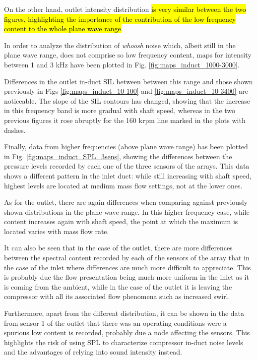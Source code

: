 On the other hand, outlet intensity distribution \hl{is very similar between the two figures, highlighting the importance of the contribution of the low frequency content to the whole plane wave range}.

In order to analyze the distribution of \emph{whoosh} noise which, albeit still in the plane wave range, does not comprise so low frequency content, maps for intensity between 1 and 3 kHz have been plotted in Fig. \ref{fig:maps_induct_1000-3000}.

Differences in the outlet in-duct SIL between between this range and those shown previously in Figs \ref{fig:maps_induct_10-100} and \ref{fig:maps_induct_10-3400} are noticeable. The slope of the SIL contours has changed, showing that the increase in this frequency band is more gradual with shaft speed, whereas in the two previous figures it rose abruptly for the 160 krpm line marked in the plots with dashes.

Finally, data from higher frequencies (above plane wave range) has been plotted in Fig. \ref{fig:maps_induct_SPL_3sens}, showing the differences between the pressure levels recorded by each one of the three sensors of the arrays. This data shows a different pattern in the inlet duct: while still increasing with shaft speed, highest levels are located at medium mass flow settings, not at the lower ones.

As for the outlet, there are again differences when comparing against previously shown distributions in the plane wave range. In this higher frequency case, while content increases again with shaft speed, the point at which the maximum is located varies with mass flow rate.

It can also be seen that in the case of the outlet, there are more differences between the spectral content recorded by each of the sensors of the array that in the case of the inlet where differences are much more difficult to appreciate. This is probably due the flow presentation being much more uniform in the inlet as it is coming from the ambient, while in the case of the outlet it is leaving the compressor with all its associated flow phenomena such as increased swirl.

Furthermore, apart from the different distribution, it can be shown in the data from sensor 1 of the outlet that there was an operating conditions were a spurious low content is recorded, probably due a node affecting the sensors. This highlights the risk of using SPL to characterize compressor in-duct noise levels and the advantages of relying into sound intensity instead.

